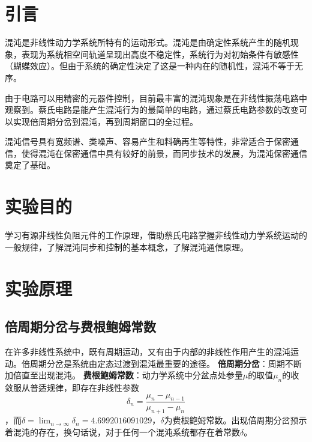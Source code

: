 \documentclass[UTF8]{ctexart}
\begin{document}
\begin{multicols}{2}
\section{引言}
混沌是非线性动力学系统所特有的运动形式。混沌是由确定性系统产生的随机现象，表现为系统相空间轨道呈现出高度不稳定性，系统行为对初始条件有敏感性（蝴蝶效应）。但由于系统的确定性決定了这是一种内在的随机性，混沌不等于无序。

由于电路可以用精密的元器件控制，目前最丰富的混沌现象是在非线性振荡电路中观察到。蔡氏电路是能产生混沌行为的最简单的电路，通过蔡氏电路参数的改变可以实现倍周期分岔到混沌，再到周期窗口的全过程。

混沌信号具有宽频谱、类噪声、容易产生和料确再生等特性，非常适合于保密通信，使得混沌在保密通信中具有较好的前景，而同步技术的发展，为混沌保密通信奠定了基础。


\section{实验目的}
学习有源非线性负阻元件的工作原理，借助蔡氏电路掌握非线性动力学系统运动的一般规律，了解混沌同步和控制的基本概念，了解混沌通信原理。

\section{实验原理}
\subsection{倍周期分岔与费根鲍姆常数}
在许多非线性系统中，既有周期运动，又有由于内部的非线性作用产生的混沌运动。倍周期分岔是系统由定态过渡到混沌最重要的途径。
\newline\textbf{倍周期分岔}：周期不断加倍直至出现混沌。
\newline\textbf{费根鲍姆常数}：动力学系统中分盆点处参量$\mu$的取值$\mu_n$的收敛服从普适规律，即存在非线性参数
\begin{equation}
\delta_{n}=\frac{\mu_{n}-\mu_{n-1}}{\mu_{n+1}-\mu_{n}}
\end{equation}
，而$\delta=\lim _{n \rightarrow \infty} \delta_{n}=4.6992016091029$，$\delta$为费根鲍姆常数。出现倍周期分岔预示着混沌的存在，换句话说，对于任何一个混沌系统都存在着常数$\delta$。


\end{multicols}
\end{document}
